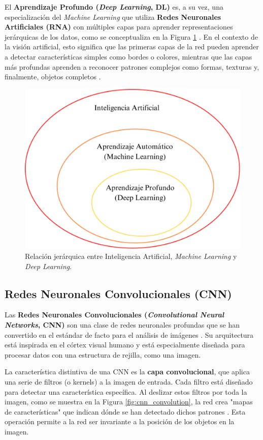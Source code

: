 El \textbf{Aprendizaje Profundo (\textit{Deep Learning}, DL)} es, a su vez, una especialización del \textit{Machine Learning} que utiliza \textbf{Redes Neuronales Artificiales (RNA)} con múltiples capas para aprender representaciones jerárquicas de los datos, como se conceptualiza en la Figura \ref{fig:MLDL} \cite{Goodfellow-et-al-2016}. En el contexto de la visión artificial, esto significa que las primeras capas de la red pueden aprender a detectar características simples como bordes o colores, mientras que las capas más profundas aprenden a reconocer patrones complejos como formas, texturas y, finalmente, objetos completos \cite{centeno2019deep}.

\begin{figure}[h!]
    \centering
    \includegraphics[width=0.5\linewidth]{Documento/Imagenes/Marco Teorico/CamposysubcamposIA.pdf}
    \caption{Relación jerárquica entre Inteligencia Artificial, \textit{Machine Learning} y \textit{Deep Learning}.}
    \label{fig:MLDL}
\end{figure}

\subsection{Redes Neuronales Convolucionales (CNN)}
\label{subsec:cnn}

Las \textbf{Redes Neuronales Convolucionales (\textit{Convolutional Neural Networks}, CNN)} son una clase de redes neuronales profundas que se han convertido en el estándar de facto para el análisis de imágenes \cite{lecun1998gradient}. Su arquitectura está inspirada en el córtex visual humano y está especialmente diseñada para procesar datos con una estructura de rejilla, como una imagen.

La característica distintiva de una CNN es la \textbf{capa convolucional}, que aplica una serie de filtros (o kernels) a la imagen de entrada. Cada filtro está diseñado para detectar una característica específica. Al deslizar estos filtros por toda la imagen, como se muestra en la Figura \ref{fig:cnn_convolution}, la red crea "mapas de características" que indican dónde se han detectado dichos patrones \cite{cnnIBM}. Esta operación permite a la red ser invariante a la posición de los objetos en la imagen.

